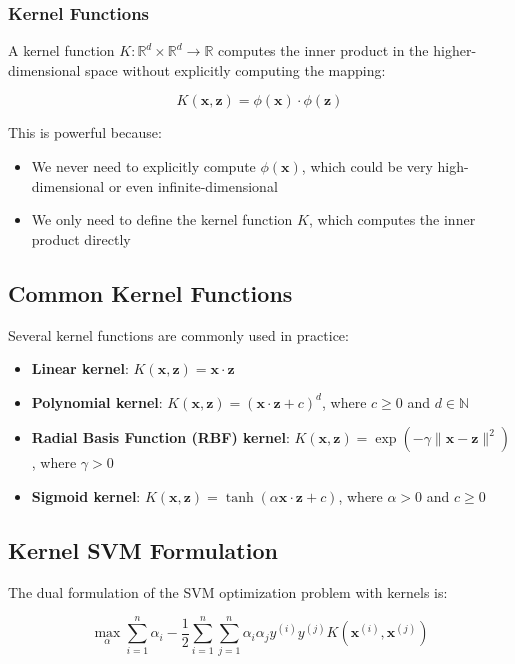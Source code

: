 \documentclass{article}
\begin{document}
\subsubsection{Kernel Functions}
A kernel function $K: \mathbb{R}^d \times \mathbb{R}^d \rightarrow \mathbb{R}$ computes the inner product in the higher-dimensional space without explicitly computing the mapping:

\[
K(\mathbf{x}, \mathbf{z}) = \phi(\mathbf{x}) \cdot \phi(\mathbf{z})
\]

This is powerful because:
\begin{itemize}
    \item We never need to explicitly compute $\phi(\mathbf{x})$, which could be very high-dimensional or even infinite-dimensional
    \item We only need to define the kernel function $K$, which computes the inner product directly
\end{itemize}

\subsection{Common Kernel Functions}
Several kernel functions are commonly used in practice:

\begin{itemize}
    \item \textbf{Linear kernel}: $K(\mathbf{x}, \mathbf{z}) = \mathbf{x} \cdot \mathbf{z}$
    \item \textbf{Polynomial kernel}: $K(\mathbf{x}, \mathbf{z}) = (\mathbf{x} \cdot \mathbf{z} + c)^d$, where $c \geq 0$ and $d \in \mathbb{N}$
    \item \textbf{Radial Basis Function (RBF) kernel}: $K(\mathbf{x}, \mathbf{z}) = \exp(-\gamma \|\mathbf{x} - \mathbf{z}\|^2)$, where $\gamma > 0$
    \item \textbf{Sigmoid kernel}: $K(\mathbf{x}, \mathbf{z}) = \tanh(\alpha \mathbf{x} \cdot \mathbf{z} + c)$, where $\alpha > 0$ and $c \geq 0$
\end{itemize}

\subsection{Kernel SVM Formulation}
The dual formulation of the SVM optimization problem with kernels is:

\[
\max_{\alpha} \sum_{i=1}^{n} \alpha_i - \frac{1}{2} \sum_{i=1}^{n} \sum_{j=1}^{n} \alpha_i \alpha_j y^{(i)} y^{(j)} K(\mathbf{x}^{(i)}, \mathbf{x}^{(j)})
\]
\end{document}
